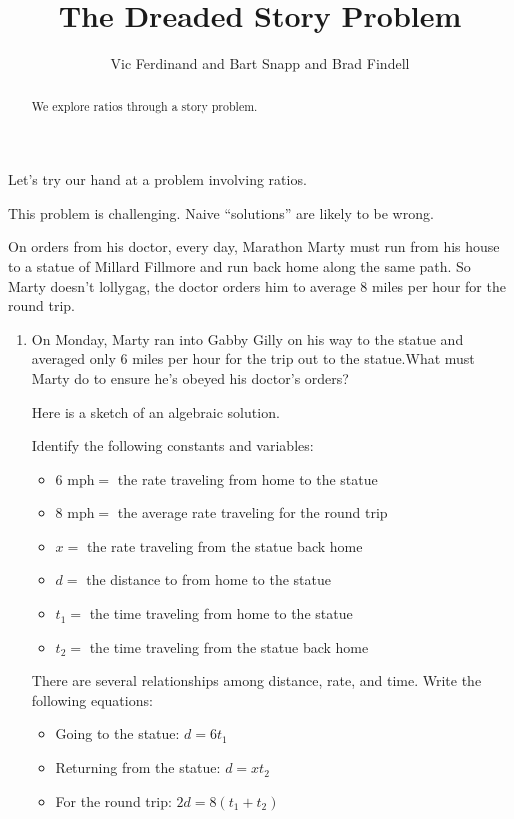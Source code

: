 \documentclass[nooutcomes]{ximera}
\title{The Dreaded Story Problem}
\author{Vic Ferdinand and Bart Snapp and Brad Findell}
\begin{document}
\begin{abstract}
  We explore ratios through a story problem.
\end{abstract}
\maketitle

\label{A:dreadedStoryProblem}

Let's try our hand at a problem involving ratios.

\begin{teachingnote}
This problem is challenging.  Naive ``solutions'' are likely to be wrong.  
\end{teachingnote}


\begin{problem}
On orders from his doctor, every day, Marathon Marty must run from his
house to a statue of Millard Fillmore and run back home along the same
path.  So Marty doesn't lollygag, the doctor orders him to average 8
miles per hour for the round trip.  
\begin{enumerate}
\item On Monday, Marty ran into Gabby Gilly on his way
to the statue and averaged only 6 miles per hour for the trip out to
the statue.What must Marty do to ensure he's obeyed his doctor's orders? 


\begin{teachingnote}
Here is a sketch of an algebraic solution.  

Identify the following constants and variables:  
\begin{itemize}
\item $6 \text{ mph} =$ the rate traveling from home to the statue
\item $8 \text{ mph} =$ the average rate traveling for the round trip
\item $x = $ the rate traveling from the statue back home
\item $d =$ the distance to from home to the statue
\item $t_1 = $ the time traveling from home to the statue
\item $t_2 = $ the time traveling from the statue back home
\end{itemize}

\vspace{0.15in}

There are several relationships among distance, rate, and time.  Write the following equations: 
\begin{itemize}
\item Going to the statue:  $d = 6t_1$
\item Returning from the statue:  $d = xt_2$
\item For the round trip:  $2d = 8(t_1+t_2)$
\end{itemize}


\end{teachingnote}
\end{enumerate}
\end{problem}
\end{document}
